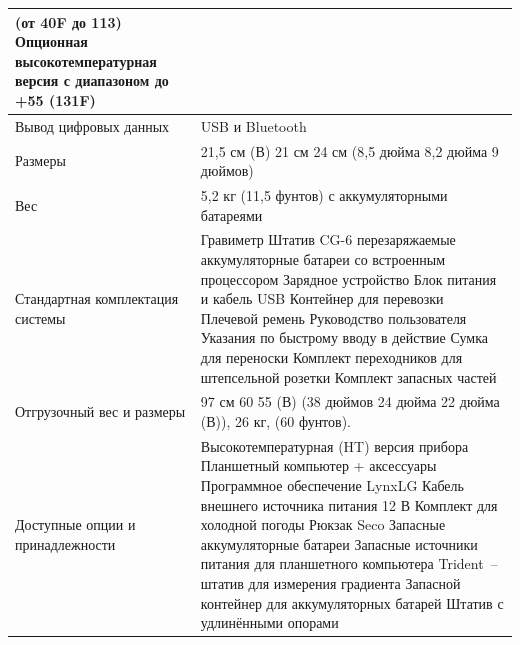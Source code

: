 \begin{longtable}{|p{}|p{}|}
  (от \textminus{}40\textdegree{}F до 113\textcelsius{}) Опционная
  высокотемпературная версия с диапазоном до +55\textcelsius{}
  (131\textdegree{}F) \\
  \hline
  Вывод цифровых данных & USB и Bluetooth \\
  \hline
  Размеры & 21,5 см (В) \texttimes{} 21 см \texttimes{} 24 см (8,5 дюйма
  \texttimes{} 8,2 дюйма \texttimes{} 9 дюймов) \\
  \hline
  Вес & 5,2 кг (11,5 фунтов) с аккумуляторными батареями \\
  \hline
  Стандартная комплектация системы &  Гравиметр \cg{} \newline Штатив CG-6
  \newline 2 перезаряжаемые аккумуляторные батареи со встроенным процессором
  \newline Зарядное устройство \newline Блок питания и кабель USB \newline
  Контейнер для перевозки \newline Плечевой ремень \newline Руководство
  пользователя \newline Указания по быстрому вводу в действие \newline Сумка
  для переноски \newline Комплект переходников для штепсельной розетки
  \newline Комплект запасных частей \\
  \hline
  Отгрузочный вес и размеры & 97 см \texttimes{} 60 \texttimes{} 55 (В) (38
  дюймов \texttimes{} 24 дюйма \texttimes{} 22 дюйма (В)), 26 кг, (60 фунтов). \\
  \hline
  Доступные опции и принадлежности & Высокотемпературная (HT) версия прибора
  \newline Планшетный компьютер + аксессуары \newline  Программное обеспечение
  LynxLG \newline  Кабель внешнего источника питания 12 В \newline  Комплект
  для холодной погоды \newline  Рюкзак Seco \newline Запасные аккумуляторные
  батареи \newline  Запасные источники питания для планшетного компьютера
  \newline  Trident~-- штатив для измерения градиента \newline  Запасной
  контейнер для аккумуляторных батарей \newline  Штатив с удлинёнными опорами
  \\
  \hline
\end{longtable}

